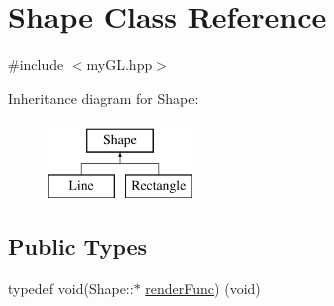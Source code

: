 \hypertarget{classShape}{}\section{Shape Class Reference}
\label{classShape}


{\ttfamily \#include $<$my\+G\+L.\+hpp$>$}

Inheritance diagram for Shape\+:\begin{figure}[H]
\begin{center}
\leavevmode
\includegraphics[height=2.000000cm]{classShape}
\end{center}
\end{figure}
\subsection*{Public Types}
\begin{DoxyCompactItemize}
\item 
typedef void(Shape\+::$\ast$ \hyperlink{classShape_ab0227d9b119beea793bce34ba3e0b5b8}{render\+Func}) (void)
\end{DoxyCompactItemize}
